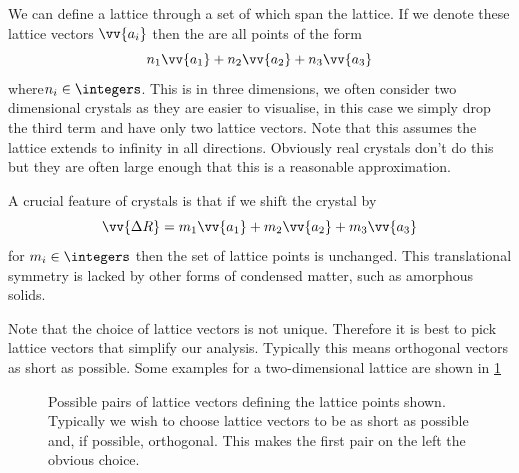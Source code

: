 \documentclass[fleqn]{NotesClass}
\begin{document}
    We can define a lattice through a set of  which span the lattice.
    If we denote these lattice vectors \(\vv{a_i}\) then the  are all points of the form
    \begin{equation}
        n_1\vv{a_1} + n_2\vv{a_2} + n_3\vv{a_3}
    \end{equation}
    where\(n_i\in\integers\).
    This is in three dimensions, we often consider two dimensional crystals as they are easier to visualise, in this case we simply drop the third term and have only two lattice vectors.
    Note that this assumes the lattice extends to infinity in all directions.
    Obviously real crystals don't do this but they are often large enough that this is a reasonable approximation.
    
    A crucial feature of crystals is that if we shift the crystal by
    \begin{equation}
        \vv{\Delta R} = m_1\vv{a_1} + m_2\vv{a_2} + m_3\vv{a_3}
    \end{equation}
    for \(m_i\in\integers\) then the set of lattice points is unchanged.
    This translational symmetry is lacked by other forms of condensed matter, such as amorphous solids.
    
    Note that the choice of lattice vectors is not unique.
    Therefore it is best to pick lattice vectors that simplify our analysis.
    Typically this means orthogonal vectors as short as possible.
    Some examples for a two-dimensional lattice are shown in \cref{fig:possible lattice vectors}
    \begin{figure}
        \caption{Possible pairs of lattice vectors defining the lattice points shown. Typically we wish to choose lattice vectors to be as short as possible and, if possible, orthogonal. This makes the first pair on the left the obvious choice.}
        \label{fig:possible lattice vectors}
    \end{figure}
    
\end{document}
